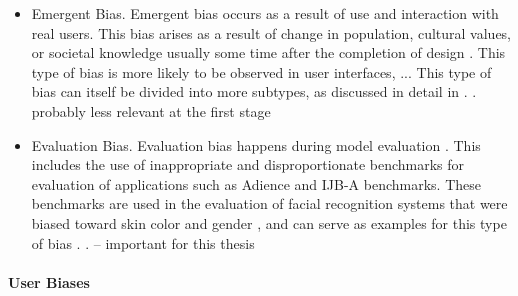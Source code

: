 \documentclass[12pt, a4paper, oneside]{book}   	%
\begin{document}
\begin{itemize}
				\item Emergent Bias. Emergent bias occurs as a result of use and interaction with real users. This bias arises as a result of change in population, cultural values, or societal knowledge usually some time after the completion of design \autocite{M53_Friedman_1996}. This type of bias is more likely to be observed in user interfaces, ... This type of bias can itself be divided into more subtypes, as discussed in detail in \autocite{M53_Friedman_1996}. \autocite{Mehrabi_2021}. probably less relevant at the first stage
				\item Evaluation Bias. Evaluation bias happens during model evaluation \autocite{M144_Suresh_2021}. This includes the use of inappropriate and disproportionate benchmarks for evaluation of applications such as Adience and IJB-A benchmarks. These benchmarks are used in the evaluation of facial recognition systems that were biased toward skin color and gender \autocite{M24_Buolamwini_2018}, and can serve as examples for this type of bias \autocite{M144_Suresh_2021}. \autocite{Mehrabi_2021}. -- important for this thesis
			\end{itemize}
			
			\paragraph{User Biases}
			
\end{document}
